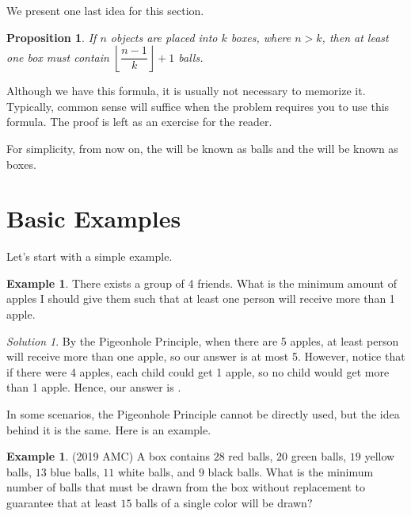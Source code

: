 \documentclass[l1pt]{article}
\theoremstyle{plain}
\newtheorem{prop}[thm]{Proposition}
\theoremstyle{definition}
\newtheorem{example}[thm]{Example}
\theoremstyle{remark}
\newtheorem*{solution}{Solution}
\begin{document}
We present one last idea for this section.

\begin{mdframed}
    \begin{prop}
    If $n$ objects are placed into $k$ boxes, where $n>k$, then at least one box must contain $\left\lfloor \dfrac{n-1}{k} \right\rfloor + 1 $ balls.
    \end{prop}
\end{mdframed}

Although we have this formula, it is usually not necessary to memorize it. Typically, common sense will suffice when the problem requires you to use this formula. The proof is left as an exercise for the reader.

\bigskip

For simplicity, from now on, the  will be known as balls and the  will be known as boxes.

\bigskip

\section{Basic Examples}
Let's start with a simple example.

\begin{example}
There exists a group of 4 friends. What is the minimum amount of apples I should give them such that at least one person will receive more than 1 apple.
\end{example}

\begin{solution}
By the Pigeonhole Principle, when there are 5 apples, at least person will receive more than one apple, so our answer is at most 5. However, notice that if there were 4 apples, each child could get 1 apple, so no child would get more than 1 apple. Hence, our answer is .
\end{solution}

\bigskip

In some scenarios, the Pigeonhole Principle cannot be directly used, but the idea behind it is the same. Here is an example.

\begin{example}
(2019 AMC) A box contains $28$ red balls, $20$ green balls, $19$ yellow balls, $13$ blue balls, $11$ white balls, and $9$ black balls. What is the minimum number of balls that must be drawn from the box without replacement to guarantee that at least $15$ balls of a single color will be drawn$?$
\end{example}
\end{document}
